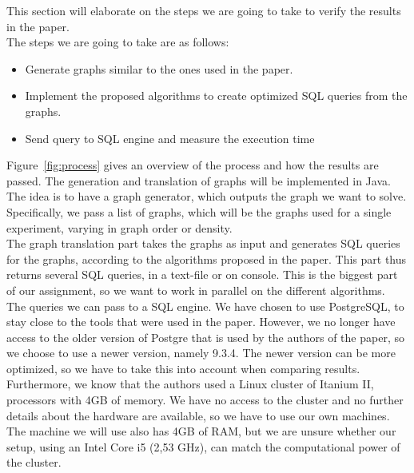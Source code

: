 This section will elaborate on the steps we are going to take to verify the results in the paper.\\

\noindent The steps we are going to take are as follows:

\begin{itemize}
	\item Generate graphs similar to the ones used in the paper.
	\item Implement the proposed algorithms to create optimized SQL queries from the graphs.
	\item Send query to SQL engine and measure the execution time
\end{itemize}

\noindent Figure~\ref{fig:process} gives an overview of the process and how the results are passed. The generation and translation of graphs will be implemented in Java. The idea is to have a graph generator, which outputs the graph we want to solve. Specifically, we pass a list of graphs, which will be the graphs used for a single experiment, varying in graph order or density. \\

The graph translation part takes the graphs as input and generates SQL queries for the graphs, according to the algorithms proposed in the paper. This part thus returns several SQL queries, in a text-file or on console. This is the biggest part of our assignment, so we want to work in parallel on the different algorithms. \\

The queries we can pass to a SQL engine. We have chosen to use PostgreSQL, to stay close to the tools that were used in the paper. However, we no longer have access to the older version of Postgre that is used by the authors of the paper, so we choose to use a newer version, namely 9.3.4.
The newer version can be more optimized, so we have to take this into account when comparing results. Furthermore, we know that the authors used a Linux cluster of Itanium II, processors with 4GB of memory. We have no access to the cluster and no further details about the hardware are available, so we have to use our own machines. The machine we will use also has 4GB of RAM, but we are unsure whether our setup, using an Intel Core i5 (2,53 GHz), can match the computational power of the cluster. %

